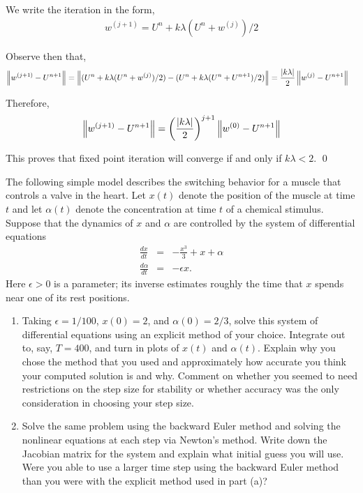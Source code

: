 \documentclass[10pt]{article}
\begin{document}
\begin{solution}[Solution]


We write the iteration in the form,
\begin{align*}
    w^{(j+1)} = U^n + k\lambda (U^n + w^{(j)})/2
\end{align*}

Observe then that,
\begin{align*}
    \left\lVert w^{(j+1)} - U^{n+1}\right\rVert &= \left\lVert(U^n + k\lambda (U^n + w^{(j)})/2) - (U^n + k\lambda (U^n + U^{n+1})/2) \right\rVert
    = \dfrac{|k\lambda|}{2}\left\lVert w^{(j)} - U^{n+1}\right\rVert
\end{align*}

Therefore,
\begin{align*}
    \left\lVert w^{(j+1)} - U^{n+1}\right\rVert = \left( \dfrac{|k\lambda|}{2} \right)^{j+1}\left\lVert w^{(0)}-U^{n+1}\right\rVert
\end{align*}

This proves that fixed point iteration will converge if and only if \( k\lambda < 2 \). \qed


\end{solution}

\begin{problem}[Problem 5]
The following simple model describes the switching behavior for a muscle that controls a valve in the heart.  Let \(x(t)\) denote the position of the muscle at time \(t\) and let \(\alpha (t)\) denote the concentration at time \(t\) of a chemical stimulus. Suppose that the dynamics of \(x\) and \(\alpha\) are controlled by the system of differential equations
\begin{eqnarray*}
\frac{dx}{dt} & = & - \frac{x^3}{3} + x + \alpha \\
\frac{d \alpha}{dt} & = & - \epsilon x .
\end{eqnarray*}
Here \(\epsilon > 0\) is a parameter; its inverse estimates roughly the time that \(x\) spends near one of its rest positions.

\begin{enumerate}[label=(\alph*)]
\item Taking \(\epsilon = 1/100\), \(x(0) = 2\), and \(\alpha (0) = 2/3\), solve this system of differential equations using an explicit method of your choice.  Integrate out to, say, \(T = 400\), and turn in plots of \(x(t)\) and \(\alpha (t)\).  Explain why you chose the method that you used and approximately how accurate you think your computed solution is and why.
Comment on whether you seemed to need restrictions on the step size for stability or whether accuracy was the only consideration in choosing your step size.
\item
Solve the same problem using the backward Euler method and solving the nonlinear
equations at each step via Newton's method.  Write down the Jacobian matrix for the system and explain what initial guess you will use.  Were you able to use a larger time step using the backward Euler method than you were with the explicit method used in part (a)?
\end{enumerate}
\end{problem}
\end{document}

